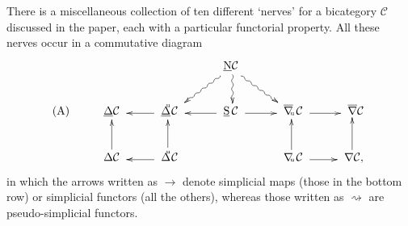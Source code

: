 \documentclass[]{amsart}
\begin{document}
There is a miscellaneous collection of ten different `nerves'  for a bicategory ${\ensuremath{\mathcal{C}}}$ discussed in
the paper, each with a particular functorial property.  All these nerves occur in a commutative
diagram
$$
\xymatrix{&&&\ \  {\ensuremath{\underline{\mathrm{N}}}}{\ensuremath{\mathcal{C}}} \ar@{~>}@<1.5pt>[d]\ar@{~>}@<1.5pt>[dl]\ \ \ar@{~>}@<-1.5pt>[dr]&&\\
\mathrm{(A)} &{\ensuremath{\underline{\Delta}}}{\ensuremath{\mathcal{C}}}\ & \ar@{->}@<1.5pt>[l]\ {\ensuremath{\underline{\Delta}}}\hspace{-4pt}^{^\mathrm{u}}{\ensuremath{\mathcal{C}}}\ &
\ar@{->}@<1.5pt>[l]\ \underline{\mathrm{S}}\,{\ensuremath{\mathcal{C}}} \ \ar@{->}@<-1.5pt>[r] &\
\overline{\nabla}\hspace{-2.5pt}_{^{_\mathrm{u}}}{\ensuremath{\mathcal{C}}}\  \ar@{->}@<-1.5pt>[r]& \ \overline{\nabla}{\ensuremath{\mathcal{C}}}
\\ & \ar@{->}@<1.5pt>[u]{\ensuremath{\Delta}}{\ensuremath{\mathcal{C}}}\
&\ar@{->}@<1.5pt>[l]\ {\ensuremath{\Delta}}\hspace{-4pt}^{^\mathrm{u}}{\ensuremath{\mathcal{C}}} \ \ar@{->}@<1.5pt>[u] &&\
\nabla\hspace{-2.5pt}_{^{_\mathrm{u}}}{\ensuremath{\mathcal{C}}} \ \ar@{->}@<1.5pt>[u] \ar@{->}@<-1.5pt>[r] & \ \nabla{\ensuremath{\mathcal{C}}}, \
\ar@{->}@<1.5pt>[u]}
$$
in which the arrows written as $\to$ denote simplicial maps (those in the bottom row) or simplicial
functors (all the others),  whereas those written as $\rightsquigarrow$ are pseudo-simplicial
functors.
\end{document}
